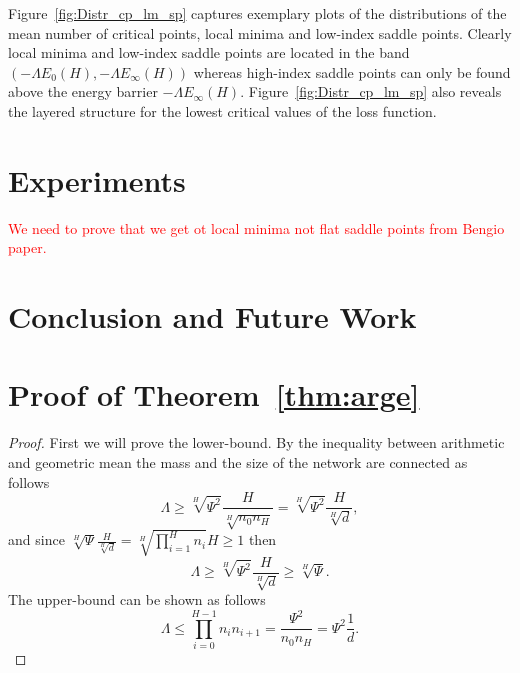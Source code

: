 \documentclass[twoside]{article}
\begin{document}
Figure~\ref{fig:Distr_cp_lm_sp} captures exemplary plots of the distributions of the mean number of critical points, local minima and low-index saddle points. Clearly local minima and low-index saddle points are located in the band $\left(-\Lambda E_0(H),-\Lambda E_{\infty}(H)\right)$ whereas high-index saddle points can only be found above the energy barrier $-\Lambda E_{\infty}(H)$. Figure~\ref{fig:Distr_cp_lm_sp} also reveals the layered structure for the lowest critical values of the loss function. 

\section{Experiments}
\label{sec:Experiments}

\textcolor{red}{We need to prove that we get ot local minima not flat saddle points from Bengio paper.}

\section{Conclusion and Future Work}
\label{sec:ConandFutWork}




\clearpage

\toptitlebar 
{\Large \bf  {} \par}
\bottomtitlebar

\section{Proof of Theorem~\ref{thm:arge}}
\begin{proof}
First we will prove the lower-bound. By the inequality between arithmetic and geometric mean the mass and the size of the network are connected as follows
\[\Lambda \geq \sqrt[H]{\Psi^2}\frac{H}{\sqrt[H]{n_0n_H}} = \sqrt[H]{\Psi^2}\frac{H}{\sqrt[H]{d}},
\]
and since $\sqrt[H]{\Psi}\frac{H}{\sqrt[H]{d}} = \sqrt[H]{\prod_{i = 1}^{H}n_i}H \geq 1$ then 
\[\Lambda \geq \sqrt[H]{\Psi^2}\frac{H}{\sqrt[H]{d}} \geq \sqrt[H]{\Psi}.
\]
The upper-bound can be shown as follows
\[\Lambda \leq \prod_{i=0}^{H-1}n_in_{i+1} = \frac{\Psi^2}{n_0n_H} = \Psi^2\frac{1}{d}.
\]
\end{proof}
\end{document}
